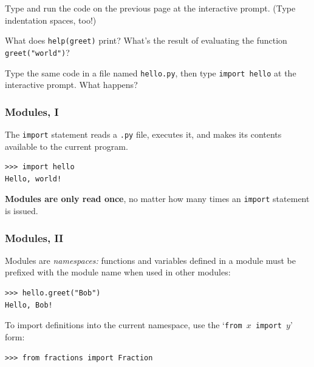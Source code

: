 \documentclass[english,serif,mathserif,xcolor=pdftex,dvipsnames,table]{beamer}
\begin{document}
\begin{frame}
  \begin{exercise}
    Type and run the code on the previous page at the interactive
    prompt. (Type indentation spaces, too!)

    What does \texttt{help(greet)} print?
    What's the result of evaluating the function \texttt{greet("world")}?
  \end{exercise}

  \+
  \begin{exercise}
    Type the same code in a file named \texttt{hello.py}, then type
    \texttt{import hello} at the interactive prompt.
    What happens?
  \end{exercise}
\end{frame}


\begin{frame}[fragile]
  \frametitle{Modules, I}
  The \texttt{import} statement reads a \texttt{.py} file, executes
  it, and makes its contents available to the current program.
\begin{lstlisting}
>>> import hello
Hello, world!
\end{lstlisting}

  \+
  \textbf{Modules are only read once}, no matter how many times an
  \texttt{import} statement is issued.
\end{frame}


\begin{frame}[fragile]
  \frametitle{Modules, II}
  Modules are \emph{namespaces:} functions and variables defined in
  a module must be prefixed with the module name when used in other
  modules:
\begin{lstlisting}
>>> hello.greet("Bob")
Hello, Bob!
\end{lstlisting}

  \+
  To import definitions into the current namespace, use the
  `\texttt{from $x$ import $y$}' form:
\begin{lstlisting}
>>> from fractions import Fraction
\end{lstlisting}
\end{frame}
\end{document}

